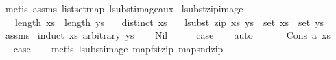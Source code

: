 \begin{isabellebody}
%
\isadelimproof
%
\endisadelimproof
%
\isatagproof
{}\isamarkupfalse%
\ {\isacharparenleft}{\kern0pt}metis\ assms\ list{\isachardot}{\kern0pt}set{\isacharunderscore}{\kern0pt}map\ lsubst{\isacharunderscore}{\kern0pt}image{\isacharunderscore}{\kern0pt}aux{\isacharparenright}{\kern0pt}%
\endisatagproof
{\isafoldproof}%
%
\isadelimproof
\isanewline
%
\endisadelimproof
\isanewline
\isanewline
{}\isamarkupfalse%
\ lsubst{\isacharunderscore}{\kern0pt}zip{\isacharunderscore}{\kern0pt}image{\isacharcolon}{\kern0pt}\isanewline
\ \ \ {\isachardoublequoteopen}length\ xs\ {\isacharequal}{\kern0pt}\ length\ ys{\isachardoublequoteclose}\isanewline
\ \ \ {\isachardoublequoteopen}distinct\ xs{\isachardoublequoteclose}\isanewline
\ \ \ {\isachardoublequoteopen}lsubst\ {\isacharparenleft}{\kern0pt}zip\ xs\ ys{\isacharparenright}{\kern0pt}\ {\isacharbackquote}{\kern0pt}\ set\ xs\ {\isacharequal}{\kern0pt}\ set\ ys{\isachardoublequoteclose}\isanewline
%
\isadelimproof
%
\endisadelimproof
%
\isatagproof
{}\isamarkupfalse%
\ assms\isanewline
{}\isamarkupfalse%
\ {\isacharparenleft}{\kern0pt}induct\ xs\ arbitrary{\isacharcolon}{\kern0pt}\ ys{\isacharparenright}{\kern0pt}\isanewline
\ \ \isamarkupfalse%
\ Nil\isanewline
\ \ \isamarkupfalse%
\ \isamarkupfalse%
\ {\isacharquery}{\kern0pt}case\isanewline
\ \ \isamarkupfalse%
\ auto\isanewline
\ \ \isamarkupfalse%
\isanewline
{}\isamarkupfalse%
\isanewline
\ \ \isamarkupfalse%
\ {\isacharparenleft}{\kern0pt}Cons\ a\ xs{\isacharparenright}{\kern0pt}\isanewline
\ \ \isamarkupfalse%
\ \isamarkupfalse%
\ {\isacharquery}{\kern0pt}case\isanewline
\ \ \isamarkupfalse%
\ {\isacharparenleft}{\kern0pt}metis\ lsubst{\isacharunderscore}{\kern0pt}image\ map{\isacharunderscore}{\kern0pt}fst{\isacharunderscore}{\kern0pt}zip\ map{\isacharunderscore}{\kern0pt}snd{\isacharunderscore}{\kern0pt}zip{\isacharparenright}{\kern0pt}\isanewline
{}\isamarkupfalse%
%
\endisatagproof
{\isafoldproof}%
%
\isadelimproof
%
\endisadelimproof
%
\isadelimdocument
%
\endisadelimdocument
%
\isatagdocument
%
\isamarkuptrue%
%
\endisatagdocument
{\isafolddocument}%
%
\isadelimdocument
%
\endisadelimdocument
%
\begin{isamarkuptext}%

\end{isamarkuptext}
\end{isabellebody}
